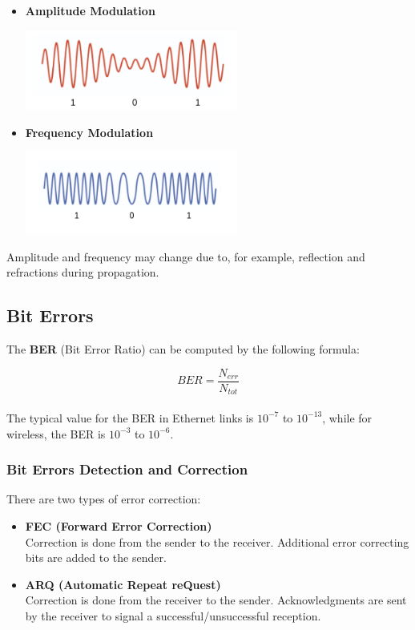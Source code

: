 \documentclass{article}
\begin{document}
\begin{itemize}
	\item \textbf{Amplitude Modulation}
	\vspace{.4cm} \\
	\centerline{\includegraphics[width=7cm]{./assets/amplitude.png}}
	\vspace{.4cm}
	
	\item \textbf{Frequency Modulation}
	\vspace{.2cm} \\
	\centerline{\includegraphics[width=7cm]{./assets/frequency.png}}
\end{itemize}
Amplitude and frequency may change due to, for example, reflection and refractions during propagation.

\subsection{Bit Errors}
The \textbf{BER} (Bit Error Ratio) can be computed by the following formula:

\[ BER = \frac{N_{err}}{N_{tot}} \] \\
\noindent The typical value for the BER in Ethernet links is $10^{-7}$ to $10^{-13}$, while for wireless, the BER is $10^{-3}$ to $10^{-6}$.

\subsubsection{Bit Errors Detection and Correction}
There are two types of error correction:

\begin{itemize}
	\item \textbf{FEC (Forward Error Correction)}
	\vspace{.2cm} \\
	Correction is done from the sender to the receiver. Additional error correcting bits are added to the sender.
	
	\item \textbf{ARQ (Automatic Repeat reQuest)}
	\vspace{.2cm} \\
	Correction is done from the receiver to the sender. Acknowledgments are sent by the receiver to signal a successful/unsuccessful reception.
\end{itemize}
\end{document}
